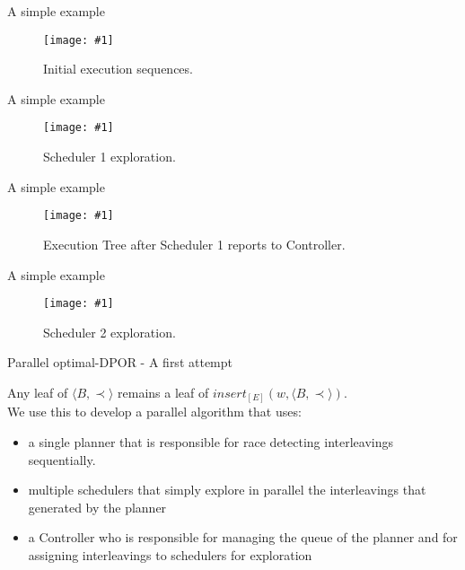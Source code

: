\documentclass[9pt]{beamer}
\newcommand{\tracelong}[2]{
\begin{figure}[H]
\centering
\texttt{[image: \#1]}
\caption{#2}
\label{#2}
\end{figure}
}
\begin{document}
\begin{frame}  {A simple example}
\tracelong{../img/src_example/1_2.png}{Initial execution sequences.}
\end{frame}


\begin{frame}  {A simple example}
\tracelong{../img/src_example/3.png}{Scheduler 1 exploration.}
\end{frame}

\begin{frame}  {A simple example}
\tracelong{../img/src_example/5.png}{Execution Tree after Scheduler 1 reports to Controller.}
\end{frame}



\begin{frame}  {A simple example}
\tracelong{../img/src_example/4.png}{Scheduler 2 exploration.}
\end{frame}


\iffalse
\begin{frame} {Parallel optimal-DPOR - A first attempt}

While trying to parallelize optimal-DPOR following the same technique we encounter two main issues:

\begin{itemize}[<+->]
\item In the sequential optimal-DPOR calls to $Explore(E, Sleep, WuT)$ guarantee that the complete subtree rooted
at $E$ will be explored. However, for this to hold true,
all sequences in $wut(E)$ that were ordered before WuT must have been explored. This means that the concept of ownership cannot be applied to complete wakeup trees.
\item $insert_{[E]}(v,wut(E))$ may end up inserting at $wut(E)$ an execution sequence different than $v$ (but one that will lead to equivalent interleavings).
\end{itemize}

\end{frame}
\fi

\begin{frame} {Parallel optimal-DPOR - A first attempt}

Any leaf of $\langle B , \prec \rangle$ remains a leaf of $insert_{[E]}(w,\langle B , \prec \rangle)$.
\\
We use this to develop a parallel algorithm that uses:

\begin{itemize}
  \item a single planner that is responsible for race detecting interleavings sequentially.
  \item multiple schedulers that simply explore in parallel the interleavings
  that generated by the planner
  \item a Controller who is responsible for managing the queue of the planner and for assigning interleavings to schedulers for exploration
\end{itemize}

\end{frame}
\end{document}

